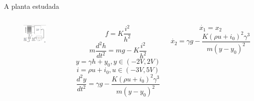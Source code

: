 \documentclass[pdf]{beamer}
\begin{document}
\begin{frame}{A planta estudada}
	\begin{columns}
		\begin{subfigure}[t]{\textwidth}
			\centering
			\includegraphics[scale=0.75]{img/esquema_planta.png}
		\end{subfigure}
		
		 $$ f = K \frac{i^2}{h^2}$$
		 $$
		 m\frac{d^2h}{dt^2} = mg - K\frac{i^2}{h^2} 
		 $$
		 $$ y = \gamma h + y_0, y \in (-2V, 2V) $$
		 $$ i = \rho u + i_0, u \in (-3V, 5V) $$		 
		 $$\boxed{
		 \frac{d^2 y}{dt^2} = \gamma g - \frac{K(\rho u + i_0)^2\gamma^3}{m(y - y_0)^2}}
		 $$
		 
		 $$\dot{x_1} = x_2 $$		 
		 $$ \dot{x_2} =  \gamma g - \frac{K(\rho u + i_0)^2\gamma^3}{m(y - y_0)^2} $$
	\end{columns}
		 

\end{frame}
\end{document}
